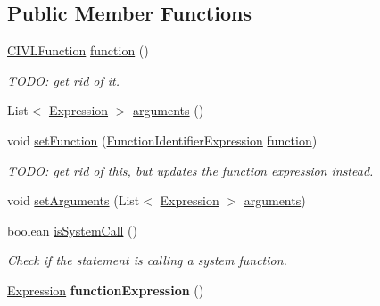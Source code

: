 \subsection*{Public Member Functions}
\begin{DoxyCompactItemize}
\item 
\hyperlink{interfaceedu_1_1udel_1_1cis_1_1vsl_1_1civl_1_1model_1_1IF_1_1CIVLFunction}{C\+I\+V\+L\+Function} \hyperlink{interfaceedu_1_1udel_1_1cis_1_1vsl_1_1civl_1_1model_1_1IF_1_1statement_1_1ContractVerifyStatement_a495f431a0e02a64d7fde3ef4454d0df2}{function} ()
\begin{DoxyCompactList}\small\item\em T\+O\+D\+O\+: get rid of it. \end{DoxyCompactList}\item 
List$<$ \hyperlink{interfaceedu_1_1udel_1_1cis_1_1vsl_1_1civl_1_1model_1_1IF_1_1expression_1_1Expression}{Expression} $>$ \hyperlink{interfaceedu_1_1udel_1_1cis_1_1vsl_1_1civl_1_1model_1_1IF_1_1statement_1_1ContractVerifyStatement_a5d5e9df82e738b60dc7fa52a4f09bd69}{arguments} ()
\item 
void \hyperlink{interfaceedu_1_1udel_1_1cis_1_1vsl_1_1civl_1_1model_1_1IF_1_1statement_1_1ContractVerifyStatement_ac4e7a84566c56276ba70387d5907a744}{set\+Function} (\hyperlink{interfaceedu_1_1udel_1_1cis_1_1vsl_1_1civl_1_1model_1_1IF_1_1expression_1_1FunctionIdentifierExpression}{Function\+Identifier\+Expression} \hyperlink{interfaceedu_1_1udel_1_1cis_1_1vsl_1_1civl_1_1model_1_1IF_1_1statement_1_1ContractVerifyStatement_a495f431a0e02a64d7fde3ef4454d0df2}{function})
\begin{DoxyCompactList}\small\item\em T\+O\+D\+O\+: get rid of this, but updates the function expression instead. \end{DoxyCompactList}\item 
void \hyperlink{interfaceedu_1_1udel_1_1cis_1_1vsl_1_1civl_1_1model_1_1IF_1_1statement_1_1ContractVerifyStatement_acf8d7343ace210654c7a793f3401204e}{set\+Arguments} (List$<$ \hyperlink{interfaceedu_1_1udel_1_1cis_1_1vsl_1_1civl_1_1model_1_1IF_1_1expression_1_1Expression}{Expression} $>$ \hyperlink{interfaceedu_1_1udel_1_1cis_1_1vsl_1_1civl_1_1model_1_1IF_1_1statement_1_1ContractVerifyStatement_a5d5e9df82e738b60dc7fa52a4f09bd69}{arguments})
\item 
boolean \hyperlink{interfaceedu_1_1udel_1_1cis_1_1vsl_1_1civl_1_1model_1_1IF_1_1statement_1_1ContractVerifyStatement_ae9a0d4b17e25afa68e32512aa9dbf352}{is\+System\+Call} ()
\begin{DoxyCompactList}\small\item\em Check if the statement is calling a system function. \end{DoxyCompactList}\item 
\hypertarget{interfaceedu_1_1udel_1_1cis_1_1vsl_1_1civl_1_1model_1_1IF_1_1statement_1_1ContractVerifyStatement_ad11e6c9bd6ff4737289a489261e4f876}{}\hyperlink{interfaceedu_1_1udel_1_1cis_1_1vsl_1_1civl_1_1model_1_1IF_1_1expression_1_1Expression}{Expression} {\bfseries function\+Expression} ()\label{interfaceedu_1_1udel_1_1cis_1_1vsl_1_1civl_1_1model_1_1IF_1_1statement_1_1ContractVerifyStatement_ad11e6c9bd6ff4737289a489261e4f876}


\end{DoxyCompactItemize}
